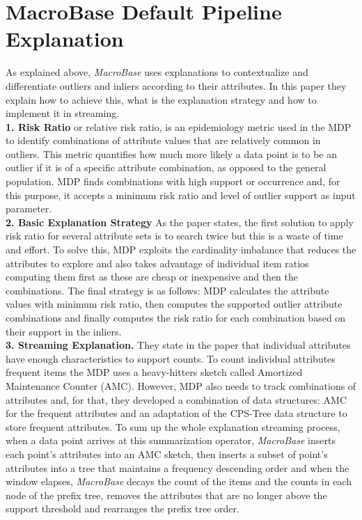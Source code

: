 \documentclass[11pt, titlepage]{article}
\begin{document}
	\section{MacroBase Default Pipeline Explanation}
	\begin{flushleft}
		As explained above, \textit{MacroBase} uses explanations to contextualize and differentiate outliers and inliers according to their attributes. In this paper they explain how to achieve this,  what is the explanation strategy and how to implement it in streaming.
		\\\textbf{1. Risk Ratio} or relative risk ratio, is an epidemiology metric used in the MDP to identify combinations of attribute values that are relatively common in outliers. This metric quantifies how much more likely a data point is to be an outlier if it is of a specific attribute combination, as opposed to the general population. MDP finds combinations with high support or occurrence and, for this purpose, it accepts a minimum risk ratio and level of outlier support as input parameter.
		\\\textbf{2. Basic Explanation Strategy} As the paper states, the first solution to apply risk ratio for several attribute sets is to search twice but this is a waste of time and effort. To solve this, MDP exploits the cardinality imbalance that reduces the attributes to explore and also takes advantage of individual item ratios computing them first as these are cheap or inexpensive and then the combinations. The final strategy is as follows: MDP calculates the attribute values with minimum risk ratio, then computes the supported outlier attribute combinations and finally computes the risk ratio for each combination based on their support in the inliers.
		\\\textbf{3. Streaming Explanation.} They state in the paper that individual attributes have enough characteristics to support counts. To count individual attributes frequent items the MDP uses a heavy-hitters sketch called Amortized Maintenance Counter (AMC). However, MDP also needs to track combinations of attributes and, for that, they developed a combination of data structures: AMC for the frequent attributes and an adaptation of the CPS-Tree data structure to store frequent attributes. To sum up the whole explanation streaming process, when a data point arrives at this summarization operator, \textit{MacroBase} inserts each point's attributes into an AMC sketch, then inserts a subset of point's attributes into a tree that maintains a frequency descending order and when the window elapses, \textit{MacroBase} decays the count of the items and the counts in each node of the prefix tree, removes the attributes that are no longer above the support threshold and rearranges the prefix tree order.
	\end{flushleft}
\end{document}
